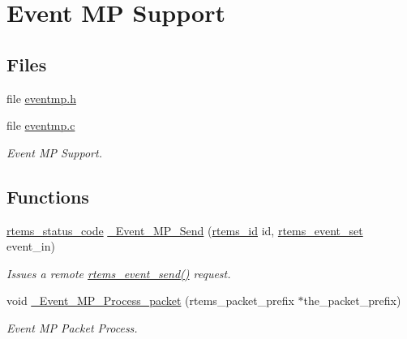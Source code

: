\hypertarget{group__ClassicEventMP}{}\section{Event MP Support}
\label{group__ClassicEventMP}
\subsection*{Files}
\begin{DoxyCompactItemize}
\item 
file \mbox{\hyperlink{eventmp_8h}{eventmp.\+h}}
\item 
file \mbox{\hyperlink{eventmp_8c}{eventmp.\+c}}
\begin{DoxyCompactList}\small\item\em Event MP Support. \end{DoxyCompactList}\end{DoxyCompactItemize}
\subsection*{Functions}
\begin{DoxyCompactItemize}
\item 
\mbox{\label{group__ClassicEventMP_ga4c6cac160ac2e5eb6ee7b9415e16aa29}} 
\mbox{\hyperlink{group__ClassicStatus_ga545d41846817eaba6143d52ee4d9e9fe}{rtems\+\_\+status\+\_\+code}} \mbox{\hyperlink{group__ClassicEventMP_ga4c6cac160ac2e5eb6ee7b9415e16aa29}{\+\_\+\+Event\+\_\+\+M\+P\+\_\+\+Send}} (\mbox{\hyperlink{group__ClassicTasks_gab20892b814dced7dd4e5b9bf42becd57}{rtems\+\_\+id}} id, \mbox{\hyperlink{group__ClassicEventSet_gab7b8f373bea85fd4e3b7ae23905faa07}{rtems\+\_\+event\+\_\+set}} event\+\_\+in)
\begin{DoxyCompactList}\small\item\em Issues a remote \mbox{\hyperlink{group__ClassicEvent_ga2d31674c165127bc530178d06d557b94}{rtems\+\_\+event\+\_\+send()}} request. \end{DoxyCompactList}\item 
void \mbox{\hyperlink{group__ClassicEventMP_ga1874d957f7df000c20e35f8c000842d6}{\+\_\+\+Event\+\_\+\+M\+P\+\_\+\+Process\+\_\+packet}} (rtems\+\_\+packet\+\_\+prefix $\ast$the\+\_\+packet\+\_\+prefix)
\begin{DoxyCompactList}\small\item\em Event MP Packet Process. \end{DoxyCompactList}\end{DoxyCompactItemize}



